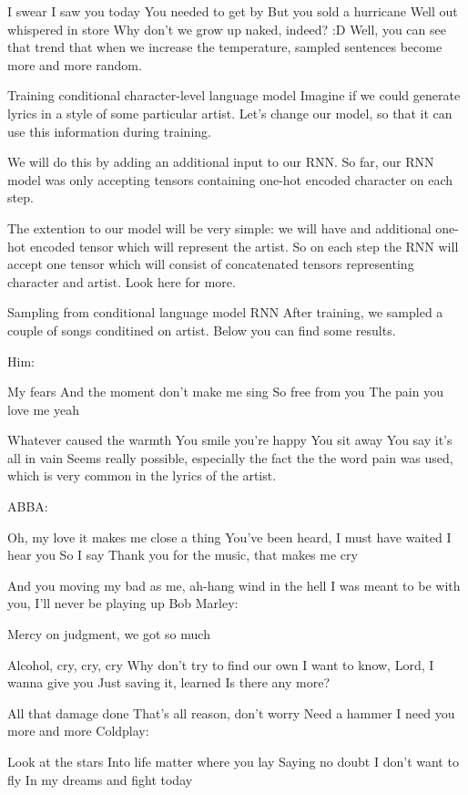 \documentclass{article}
\begin{document}
I swear I saw you today  
You needed to get by  
But you sold a hurricane  
Well out whispered in store
Why don’t we grow up naked, indeed? :D Well, you can see that trend that when we increase the temperature, sampled sentences become more and more random.

Training conditional character-level language model
Imagine if we could generate lyrics in a style of some particular artist. Let’s change our model, so that it can use this information during training.

We will do this by adding an additional input to our RNN. So far, our RNN model was only accepting tensors containing one-hot encoded character on each step.

The extention to our model will be very simple: we will have and additional one-hot encoded tensor which will represent the artist. So on each step the RNN will accept one tensor which will consist of concatenated tensors representing character and artist. Look here for more.

Sampling from conditional language model RNN
After training, we sampled a couple of songs conditined on artist. Below you can find some results.

Him:

My fears  
And the moment don't make me sing  
So free from you  
The pain you love me yeah  
  
Whatever caused the warmth  
You smile you're happy  
You sit away  
You say it's all in vain  
Seems really possible, especially the fact the the word pain was used, which is very common in the lyrics of the artist.

ABBA:

Oh, my love it makes me close a thing  
You've been heard, I must have waited  
I hear you  
So I say  
Thank you for the music, that makes me cry  
  
And you moving my bad as me, ah-hang wind in the hell  
I was meant to be with you, I'll never be playing up
Bob Marley:

Mercy on judgment, we got so much  
  
Alcohol, cry, cry, cry  
Why don't try to find our own  
I want to know, Lord, I wanna give you  
Just saving it, learned  
Is there any more?  
  
All that damage done  
That's all reason, don't worry  
Need a hammer  
I need you more and more  
Coldplay:

Look at the stars  
Into life matter where you lay  
Saying no doubt  
I don't want to fly  
In my dreams and fight today
\end{document}
